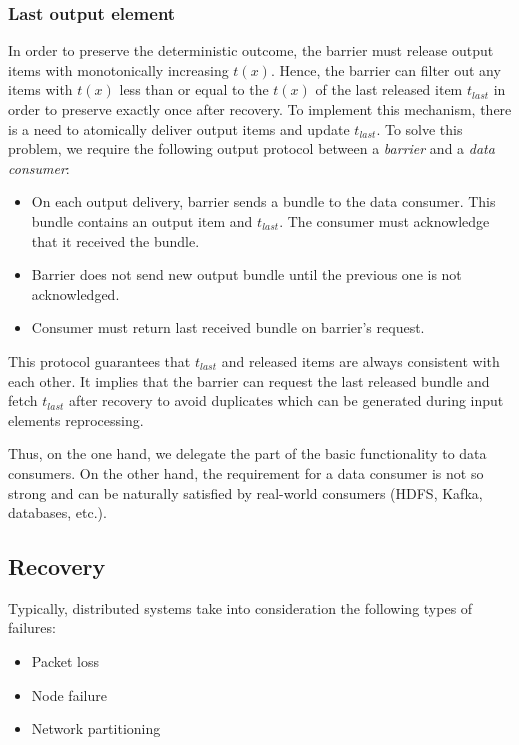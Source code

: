 \subsubsection{Last output element}

In order to preserve the deterministic outcome, the barrier must release output items with monotonically increasing $t(x)$. Hence, the barrier can filter out any items with $t(x)$ less than or equal to the $t(x)$ of the last released item $t_{last}$ in order to preserve exactly once after recovery. To implement this mechanism, there is a need to atomically deliver output items and update $t_{last}$. To solve this problem, we require the following output protocol between a {\em barrier} and a {\em data consumer}: 

\begin{itemize}
    \item On each output delivery, barrier sends a bundle to the data consumer. This bundle contains an output item and $t_{last}$. The consumer must acknowledge that it received the bundle.
    \item Barrier does not send new output bundle until the previous one is not acknowledged.
    \item Consumer must return last received bundle on barrier's request.
\end{itemize}

This protocol guarantees that $t_{last}$ and released items are always consistent with each other. It implies that the barrier can request the last released bundle and fetch $t_{last}$ after recovery to avoid duplicates which can be generated during input elements reprocessing.

Thus, on the one hand, we delegate the part of the basic functionality to data consumers. On the other hand, the requirement for a data consumer is not so strong and can be naturally satisfied by real-world consumers (HDFS, Kafka, databases, etc.). 

\subsection{Recovery}

Typically, distributed systems take into consideration the following types of failures:
\begin{itemize}
    \item Packet loss
    \item Node failure
    \item Network partitioning
\end{itemize}

